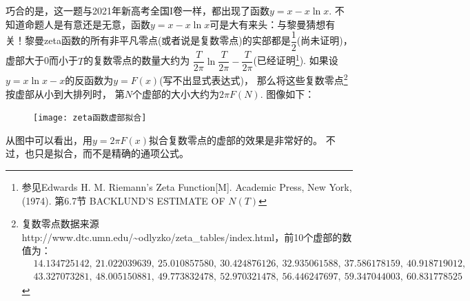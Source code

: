 \begin{enumerate}[label={【\textbf{例\thechapter.\arabic*}】},
 leftmargin=\inteval{\myenumleftmargin}pt,
 itemsep=\inteval{\myenumitempsep}pt,
 itemindent=\inteval{\myenumitemindent}pt]
巧合的是，这一题与2021年新高考全国I卷一样，都出现了函数$ y= x-x\ln x $. 不知道命题人是有意还是无意，函数$ y= x-x\ln x $可是大有来头：与黎曼猜想有关！黎曼zeta函数的所有非平凡零点(或者说是复数零点)的实部都是$ \dfrac{1}{2} $(尚未证明)，
虚部大于0而小于$ T $的复数零点的数量大约为
$ \dfrac{T}{2\pi}\ln\dfrac{T}{2\pi}-\dfrac{T}{2\pi} $(已经证明\footnote{参见Edwards H. M. Riemann's Zeta Function[M]. Academic Press, New York, (1974). 第6.7节 BACKLUND'S ESTIMATE OF $ N(T) $}).
如果设$ y=x\ln x-x $的反函数为$ y=F(x) $(写不出显式表达式)，
那么将这些复数零点\footnote{复数零点数据来源 http://www.dtc.umn.edu/\~{}odlyzko/zeta\_{}tables/index.html，前10个虚部的数值为：
\begin{align*}
    & 14.134725142,\ 21.022039639,\ 25.010857580,\ 30.424876126,
    \ 32.935061588,\ 37.586178159,\ 40.918719012, \\
    & 43.327073281,\ 48.005150881,\ 49.773832478,\ 52.970321478,
    \ 56.446247697,\ 59.347044003,\ 60.831778525
\end{align*}
}按虚部从小到大排列时，
第$ N $个虚部的大小大约为$ 2\pi F(N) $. 图像如下：
\begin{figure}[H]
    \centering
    \texttt{[image: zeta函数虚部拟合]}
\end{figure}

从图中可以看出，用$ y=2\pi F(x) $拟合复数零点的虚部的效果是非常好的。
不过，也只是拟合，而不是精确的通项公式。


\end{enumerate}
